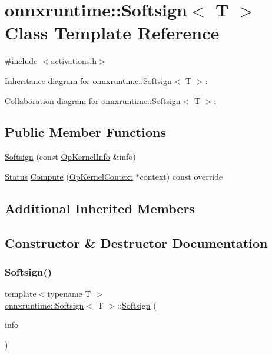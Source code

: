 \hypertarget{classonnxruntime_1_1Softsign}{}\section{onnxruntime\+:\+:Softsign$<$ T $>$ Class Template Reference}
\label{classonnxruntime_1_1Softsign}


{\ttfamily \#include $<$activations.\+h$>$}



Inheritance diagram for onnxruntime\+:\+:Softsign$<$ T $>$\+:


Collaboration diagram for onnxruntime\+:\+:Softsign$<$ T $>$\+:
\subsection*{Public Member Functions}
\begin{DoxyCompactItemize}
\item 
\mbox{\hyperlink{classonnxruntime_1_1Softsign_a2722ea17ddc50a4cf520ed5d1c5199ba}{Softsign}} (const \mbox{\hyperlink{classonnxruntime_1_1OpKernelInfo}{Op\+Kernel\+Info}} \&info)
\item 
\mbox{\hyperlink{classonnxruntime_1_1common_1_1Status}{Status}} \mbox{\hyperlink{classonnxruntime_1_1Softsign_ad327082448c3c2032f761df247fffda9}{Compute}} (\mbox{\hyperlink{classonnxruntime_1_1OpKernelContext}{Op\+Kernel\+Context}} $\ast$context) const override
\end{DoxyCompactItemize}
\subsection*{Additional Inherited Members}


\subsection{Constructor \& Destructor Documentation}
\mbox{\label{classonnxruntime_1_1Softsign_a2722ea17ddc50a4cf520ed5d1c5199ba}} 
\subsubsection{\texorpdfstring{Softsign()}{Softsign()}}
{\footnotesize\ttfamily template$<$typename T $>$ \\
\mbox{\hyperlink{classonnxruntime_1_1Softsign}{onnxruntime\+::\+Softsign}}$<$ T $>$\+::\mbox{\hyperlink{classonnxruntime_1_1Softsign}{Softsign}} (\begin{DoxyParamCaption}\item[{const \mbox{\hyperlink{classonnxruntime_1_1OpKernelInfo}{Op\+Kernel\+Info}} \&}]{info }\end{DoxyParamCaption})\hspace{0.3cm}{\ttfamily [inline]}}



